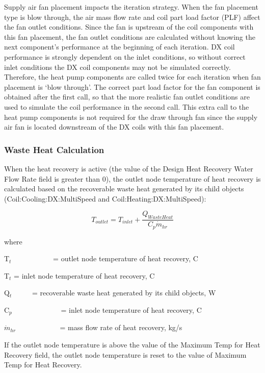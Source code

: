Supply air fan placement impacts the iteration strategy. When the fan placement type is blow through, the air mass flow rate and coil part load factor (PLF) affect the fan outlet conditions. Since the fan is upstream of the coil components with this fan placement, the fan outlet conditions are calculated without knowing the next component's performance at the beginning of each iteration. DX coil performance is strongly dependent on the inlet conditions, so without correct inlet conditions the DX coil components may not be simulated correctly. Therefore, the heat pump components are called twice for each iteration when fan placement is `blow through'. The correct part load factor for the fan component is obtained after the first call, so that the more realistic fan outlet conditions are used to simulate the coil performance in the second call. This extra call to the heat pump components is not required for the draw through fan since the supply air fan is located downstream of the DX coils with this fan placement.

\subsubsection{Waste Heat Calculation}\label{waste-heat-calculation-1}

When the heat recovery is active (the value of the Design Heat Recovery Water Flow Rate field is greater than 0), the outlet node temperature of heat recovery is calculated based on the recoverable waste heat generated by its child objects (Coil:Cooling:DX:MultiSpeed and Coil:Heating:DX:MultiSpeed):

\begin{equation}
{T_{outlet}} = {T_{inlet}} + \frac{{{Q_{WasteHeat}}}}{{{C_p}{{\dot m}_{hr}}}}
\end{equation}

where

T\(_{t}\)~~~~~~~~~~~ = outlet node temperature of heat recovery, C

T\(_{t}\) = inlet node temperature of heat recovery, C

Q\(_{t}\)~~~~~ = recoverable waste heat generated by its child objects, W

C\(_{p}\)~~~~~~~~~~~~~ = inlet node temperature of heat recovery, C

\({{{\dot m}_{hr}}}\) ~~~~~~~~~~~ = mass flow rate of heat recovery, kg/s

If the outlet node temperature is above the value of the Maximum Temp for Heat Recovery field, the outlet node temperature is reset to the value of Maximum Temp for Heat Recovery.

